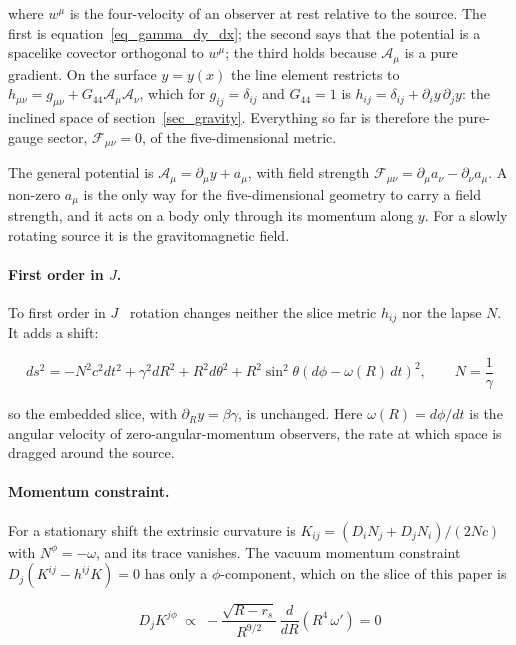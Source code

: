 \documentclass[anonymous]{iopjournal}
\begin{document}
where $w^\mu$ is the four-velocity of an observer at rest relative to the source. The first is equation~\eqref{eq_gamma_dy_dx}; the second says that the potential is a spacelike covector orthogonal to $w^\mu$; the third holds because $\mathcal{A}_\mu$ is a pure gradient. On the surface $y=y(x)$ the line element restricts to $h_{\mu\nu}=g_{\mu\nu}+G_{44}\mathcal{A}_\mu\mathcal{A}_\nu$, which for $g_{ij}=\delta_{ij}$ and $G_{44}=1$ is $h_{ij}=\delta_{ij}+\partial_i y\,\partial_j y$: the inclined space of section~\ref{sec_gravity}. Everything so far is therefore the pure-gauge sector, $\mathcal{F}_{\mu\nu}=0$, of the five-dimensional metric.

The general potential is $\mathcal{A}_\mu=\partial_\mu y+a_\mu$, with field strength $\mathcal{F}_{\mu\nu}=\partial_\mu a_\nu-\partial_\nu a_\mu$. A non-zero $a_\mu$ is the only way for the five-dimensional geometry to carry a field strength, and it acts on a body only through its momentum along $y$. For a slowly rotating source it is the gravitomagnetic field.

\paragraph{First order in $J$.} To first order in $J$~\cite{Hartle1967} rotation changes neither the slice metric $h_{ij}$ nor the lapse $N$. It adds a shift:

\begin{equation}\label{eq_slow_rotation}
    ds^2=-N^2c^2dt^2+\gamma^2dR^2+R^2d\theta^2+R^2\sin^2\theta\left(d\phi-\omega(R)\,dt\right)^2,
    \qquad N=\frac1\gamma
\end{equation}

so the embedded slice, with $\partial_Ry=\beta\gamma$, is unchanged. Here $\omega(R)=d\phi/dt$ is the angular velocity of zero-angular-momentum observers, the rate at which space is dragged around the source.

\paragraph{Momentum constraint.} For a stationary shift the extrinsic curvature is $K_{ij}=\left(D_iN_j+D_jN_i\right)/(2Nc)$ with $N^\phi=-\omega$, and its trace vanishes. The vacuum momentum constraint $D_j\!\left(K^{ij}-h^{ij}K\right)=0$ has only a $\phi$-component, which on the slice of this paper is

\begin{equation}\label{eq_momentum_vacuum}
    D_jK^{j\phi}\;\propto\;-\frac{\sqrt{R-r_s}}{R^{9/2}}\,\frac{d}{dR}\!\left(R^4\,\omega'\right)=0
\end{equation}
\end{document}
